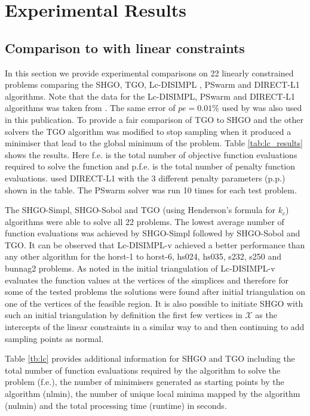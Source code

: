 \chapter{Experimental Results} \label{sec:results}
\section{Comparison to with linear constraints}

In this section we provide experimental comparisons on 22 linearly constrained problems comparing the SHGO, TGO, Lc-DISIMPL \citep{Paul2016}, PSwarm \citep{Vaz2008} and DIRECT-L1 \citep{finkel2003direct} algorithms. Note that the data for the Lc-DISIMPL, PSwarm and DIRECT-L1 algorithms was taken from \citet{Paul2016}. The same error of $pe = 0.01\%$ used by \citet{Paul2016} was also used in this publication. To provide a fair comparison of TGO to SHGO and the other solvers the TGO algorithm was modified to stop sampling when it produced a minimiser that lead to the global minimum of the problem. Table \ref{tab:lc_results} shows the results. Here f.e. is the total number of objective function evaluations required to solve the function and p.f.e. is the total number of penalty function evaluations. \citet{Paul2016} used DIRECT-L1 with the 3 different penalty parameters (p.p.) shown in the table. The PSwarm solver was run 10 times for each test problem. 

The SHGO-Simpl, SHGO-Sobol and TGO (using Henderson's formula for $k_c$) algorithms were able to solve all 22 problems. The lowest average number of function evaluations was achieved by SHGO-Simpl followed by SHGO-Sobol and TGO. It can be observed that Lc-DISIMPL-v achieved a better performance than any other algorithm for the horst-1 to horst-6, hs024, hs035, s232, s250 and bunnag2 problems. As noted in \citet{Paul2016} the initial triangulation of Lc-DISIMPL-v evaluates the function values at the vertices of the simplices and therefore for some of the tested problems the solutions were found after initial triangulation on one of the vertices of the feasible region. It is also possible to initiate SHGO with such an initial triangulation by definition the first few vertices in $\mathcal{X}$ as the intercepts of the linear constraints in a similar way to \citet{Paul2016} and then continuing to add sampling points as normal.

Table \ref{tb:lc} provides additional information for SHGO and TGO including the total number of function evaluations required by the algorithm to solve the problem (f.e.), the number of minimisers generated as starting points by the algorithm (nlmin), the number of unique local minima mapped by the algorithm (nulmin) and the total processing time (runtime) in seconds.

